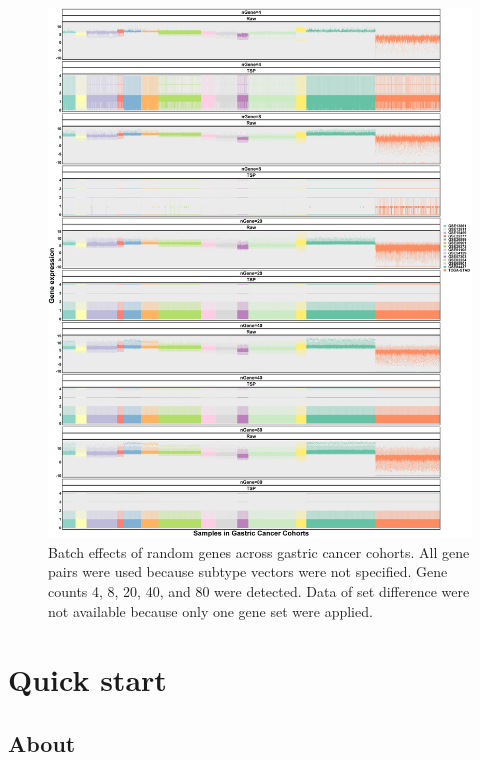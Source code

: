 \documentclass[
  12pt,
]{book}
\begin{document}
\begin{figure}

{\centering \includegraphics[width=0.9\linewidth]{./fig/bactch-effect-02} 

}

\caption{Batch effects of random genes across gastric cancer cohorts.  All gene pairs were used because subtype vectors were not specified. Gene counts 4, 8, 20, 40, and 80 were detected. Data of set difference were not available because only one gene set were applied.}\label{fig:be02}
\end{figure}

\hypertarget{quick-start}{%
\chapter{Quick start}\label{quick-start}}

\hypertarget{about}{%
\section{About}\label{about}}
\end{document}
